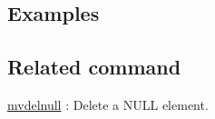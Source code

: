 \subsection*{Examples}


\subsection*{Related command}
\hyperref[sect:mvdelnull]{mvdelnull} : Delete a NULL element.

%
